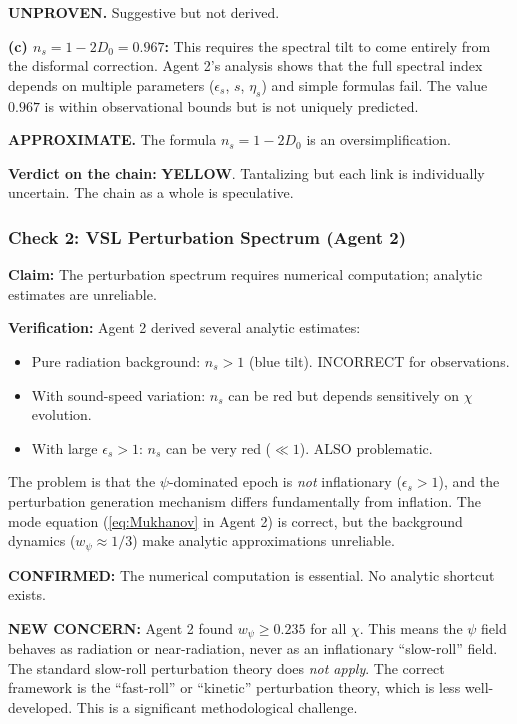 \documentclass[11pt,a4paper]{article}
\newcommand{\YELLOW}{\textcolor{dfdyellow}{\textbf{YELLOW}}}
\begin{document}
\textcolor{dfdyellow}{\textbf{UNPROVEN.}} Suggestive but not derived.

\textbf{(c) $n_s = 1 - 2D_0 = 0.967$:} This requires the spectral tilt to come entirely from the disformal correction. Agent 2's analysis shows that the full spectral index depends on multiple parameters ($\epsilon_s$, $s$, $\eta_s$) and simple formulas fail. The value $0.967$ is within observational bounds but is not uniquely predicted.

\textcolor{dfdyellow}{\textbf{APPROXIMATE.}} The formula $n_s = 1 - 2D_0$ is an oversimplification.

\textbf{Verdict on the chain:} \YELLOW. Tantalizing but each link is individually uncertain. The chain as a whole is speculative.

\subsubsection{Check 2: VSL Perturbation Spectrum (Agent 2)}

\textbf{Claim:} The perturbation spectrum requires numerical computation; analytic estimates are unreliable.

\textbf{Verification:} Agent 2 derived several analytic estimates:
\begin{itemize}
\item Pure radiation background: $n_s > 1$ (blue tilt). INCORRECT for observations.
\item With sound-speed variation: $n_s$ can be red but depends sensitively on $\chi$ evolution.
\item With large $\epsilon_s > 1$: $n_s$ can be very red ($\ll 1$). ALSO problematic.
\end{itemize}

The problem is that the $\psi$-dominated epoch is \emph{not} inflationary ($\epsilon_s > 1$), and the perturbation generation mechanism differs fundamentally from inflation. The mode equation (\ref{eq:Mukhanov} in Agent 2) is correct, but the background dynamics ($w_\psi \approx 1/3$) make analytic approximations unreliable.

\textcolor{dfdyellow}{\textbf{CONFIRMED:}} The numerical computation is essential. No analytic shortcut exists.

\textbf{NEW CONCERN:} Agent 2 found $w_\psi \geq 0.235$ for all $\chi$. This means the $\psi$ field behaves as radiation or near-radiation, never as an inflationary ``slow-roll'' field. The standard slow-roll perturbation theory does \emph{not apply}. The correct framework is the ``fast-roll'' or ``kinetic'' perturbation theory, which is less well-developed. This is a significant methodological challenge.
\end{document}
